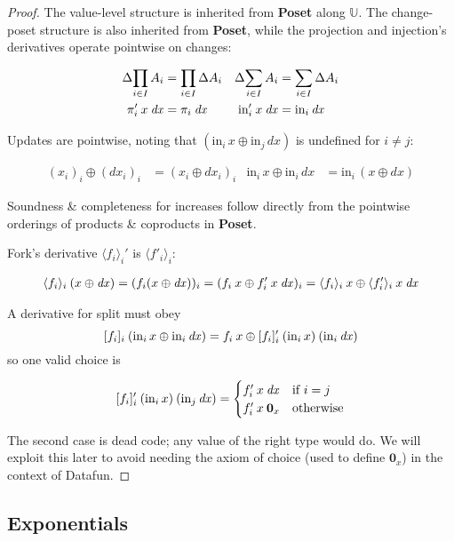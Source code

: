 \documentclass{rntz}\usepackage[a5]{rntzgeometry}\usepackage[fullwidth=130mm,width=330pt,]{narrow}
\newcommand\mathvar[1]{\ensuremath{#1}} %
\renewcommand\mathvar[1]{\ensuremath{\mathit{#1}}} %
\newcommand\cat\textbf
\newcommand\Poset{\cat{Poset}}
\newcommand\D\Delta
\newcommand\injc{\text{in}}
\newcommand\inj[1]{\injc_{#1}\,}
\newcommand\zero{\ensuremath{\mathbold{0}}}
\newcommand\<{\mskip 4mu plus 4mu minus 1mu}
\newcommand\dx{\mathvar{dx}}
\newcommand\valfn{\ensuremath{\mathbb{U}}}
\newcommand\chgs[1]{\D{#1}}
\newcommand\deriv[1]{\ensuremath{#1'}}
\newcommand\upd{\mathbin{\oplus}}
\newcommand\fork[1]{\langle{#1}\rangle}
\newcommand\krof[1]{[{#1}]}
\begin{document}
\begin{proof}
  The value-level structure is inherited from \Poset{} along \valfn{}. The
  change-poset structure is also inherited from \Poset{}, while the projection
  and injection's derivatives operate pointwise on changes:

  \begin{align*}
    \chgs{\prod_{i \in I} A_i} &= \prod_{i \in I} \chgs A_i &
    \chgs{\sum_{i \in I} A_i} &= \sum_{i \in I} \chgs A_i
    \\
    \deriv\pi_i\<x\<\dx &= \pi_i\<\dx & \deriv\injc_i\<x\<\dx &= \inj i \dx
  \end{align*}

  \noindent Updates are pointwise, noting that $(\inj i x \upd \inj j \dx)$ is
  undefined for $i \ne j$:

  \begin{align*}
    (x_i)_i \upd (\dx_i)_i &= (x_i \upd \dx_i)_i &
    \inj i x \upd \inj i \dx &= \inj i (x \upd \dx)
  \end{align*}

  \noindent
  Soundness \& completeness for increases follow directly from the pointwise
  orderings of products \& coproducts in \Poset{}.

  Fork's derivative $\deriv{\fork{f_i}_i}$ is $\fork{\deriv f_i}_i$:

  \begin{gather*}
    \fork{f_i}_i \<(x \upd \dx)
    = (f_i(x \upd \dx))_i
    = (f_i\<x \upd \deriv f_i \<x \<\dx)_i
    = \fork{f_i}_i \<x \upd \fork{\deriv f_i}_i \<x \<\dx
  \end{gather*}

  \noindent
  A derivative for split must obey \[ \krof{f_i}_i\<(\inj i x \upd \inj i \dx)
  = f_i\<x \upd \deriv{\krof{f_i}_i} \<(\inj i x) \<(\inj i \dx) \] so one
  valid choice is

  \[\deriv{\krof{f_i}_i} \<(\inj i x) \<(\inj j \dx)
  =
  \begin{cases}
    \deriv f_i \<x \<\dx & \text{if}~i = j\\
    \deriv f_i \<x \<\zero_x & \text{otherwise}
  \end{cases}
  \]

  \noindent
  The second case is dead code; any value of the right type would do. We will
  exploit this later to avoid needing the axiom of choice (used to define
  $\zero_x$) in the context of Datafun.
\end{proof}


\subsection{Exponentials}
\end{document}
